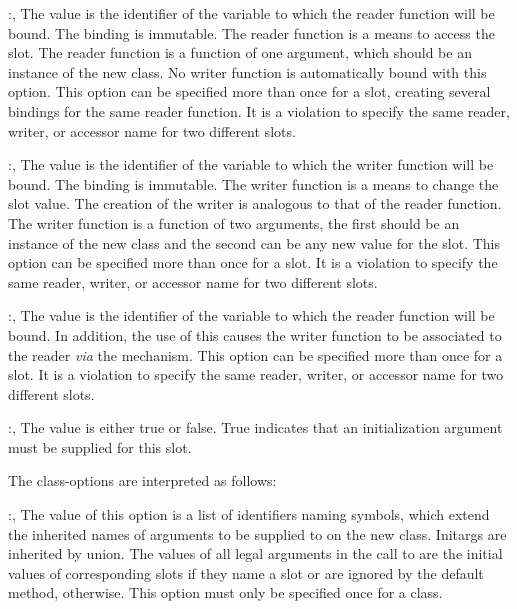 \begin{optDefinition}
\begin{options}
    \item[\keyworddef{reader}:, \scref{identifier}]%
    The value is the identifier of the variable to which the reader function
    will be bound.  The binding is immutable.  The reader function is a means to
    access the slot.  The reader function is a function of one argument, which
    should be an instance of the new class.  No writer function is automatically
    bound with this option.  This option can be specified more than once for a
    slot, creating several bindings for the same reader function. It is a
    violation to specify the same reader, writer, or accessor name for two
    different slots.

    \item[\keyworddef{writer}:, \scref{identifier}]%
    The value is the identifier of the variable to which the writer function
    will be bound.  The binding is immutable.  The writer function is a means to
    change the slot value.  The creation of the writer is analogous to that of
    the reader function. The writer function is a function of two arguments, the
    first should be an instance of the new class and the second can be any new
    value for the slot.  This option can be specified more than once for a slot.
    It is a violation to specify the same reader, writer, or accessor name
    for two different slots.

    \item[\keyworddef{accessor}:, \scref{identifier}]%
    The value is the identifier of the variable to which the reader function
    will be bound. In addition, the use of this  causes the
    writer function to be associated to the reader {\em via\/} the
     mechanism. This option can be specified more than once
    for a slot. It is a violation to specify the same reader, writer, or
    accessor name for two different slots.

    \item[\keyworddef{requiredp}:, \scref{boolean}]%
    The value is either true or false. True indicates that an initialization
    argument must be supplied for this slot.
\end{options}
%
The class-options are interpreted as follows:
%
\begin{options}
    \item[\keyworddef{keywords}:, \scref{list}]%
    The value of this option is a list of identifiers naming symbols, which
    extend the inherited names of arguments to be supplied to 
    on the new class.  Initargs are inherited by union. The values of all legal
    arguments in the call to  are the initial values of
    corresponding slots if they name a slot  or are ignored by
    the default  method, otherwise. This option must only
    be specified once for a class.


\end{options}
\end{optDefinition}
